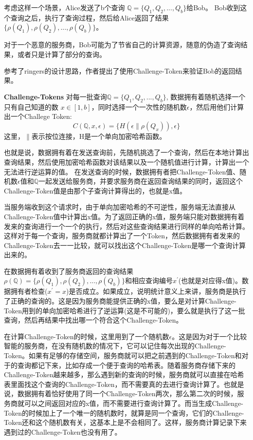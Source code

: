 考虑这样一个场景，Alice发送了b个查询 $\mathbb{Q} = \{Q_1, Q_2, ... ,Q_b\}$给Bob。
Bob收到这个查询之后，执行了查询过程，然后给Alice返回了结果$\{\rho(Q_1), \rho(Q_2), ..., \rho(Q_b)\}$。

对于一个恶意的服务商，Bob可能为了节省自己的计算资源，随意的伪造了查询结果，或者只是计算了部分的查询。

参考了ringers\cite{golle2001uncheatable}的设计思路，作者提出了使用Challenge-Token来验证Bob的返回结果。

\textbf{Challenge-Tokens} 对每一批查询$\mathbb{Q} = \{Q_1, Q_2, ... ,Q_b\}$, 数据拥有着随机选择一个只有自己知道的数 $x \in [1, b]$，同时选择一个一次性的随机数$\epsilon$，然后用他们计算出一个Challege Token:
\begin{equation} C(\mathbb{Q}, x, \epsilon) = \{H(\epsilon \parallel \rho(Q_x)), \epsilon\}\end{equation}
这里，$\parallel$表示按位连接，H是一个单向加密哈希函数。

也就是说，数据拥有着在发送查询前，先随机挑选了一个查询，然后在本地计算出查询结果，然后使用加密哈希函数对该结果以及一个随机值进行计算，计算出一个无法进行逆运算的值。
在发送查询的时候，数据拥有者把Challenge-Token值、随机数$\epsilon$值和$\mathbb{Q}$一起发送给服务商，并要求服务商在返回查询结果的同时，返回这个Challenge-Token值是由那个子查询计算得出的，也就是x值。

当服务端收到这个请求时，由于单向加密哈希的不可逆性，服务端无法直接从Challenge-Token值中计算出x值。为了返回正确的x值，服务端只能对数据拥有着发来的查询进行一个一个的执行，然后对这些查询结果进行同样的单向哈希计算。这样对于每一个查询，服务商就都计算出了一个Token，然后数据拥有者发来的Challenge-Token去一一比较，就可以找出这个Challenge-Token是哪一个查询计算出来的。

在数据拥有着收到了服务商返回的查询结果$\rho(\mathbb{Q}) = \{\rho(Q_1), \rho(Q_2), ..., \rho(Q_b)\}$和相应查询编号$x^\prime$(也就是对应得x值)。数据拥有者检查($x^\prime = x$)是否成立。如果成立，说明统计意义上来讲，服务商是执行了正确的查询的。这是因为服务商能提供正确的x值，要么是对计算Challenge-Token用到的单向加密哈希进行了逆运算(这是不可能的)，要么就是执行了这一批查询，然后再结果中找出哪一个符合这个Challenge-Token。

在计算Challenge-Token的时候，这里用到了一个随机数$\epsilon$。这是因为对于一个比较智能的服务商，在没有随机数的情况下，它可以记住每次出现的Challenge-Token。如果有足够的存储空间，服务商就可以把之前遇到的Challenge-Token和对于的查询都记下来，比如存成一个便于查询的哈希表。随着服务商存储下来的Challenge-Token越来越多，那么遇到新的查询的时候，服务商就可以直接在哈希表里面找这个查询的Challenge-Token，而不需要真的去进行查询计算了。也就是说，数据拥有着恰好使用了同一个Challenge-Token两次，那么第二次的时候，服务商就可以之间返回对应的x值，而不需要进行查询计算了。而当生成Challenge-Token的时候加上了一个唯一的随机数时，就算是同一个查询，它们的Challenge-Token还和这个随机数有关，这基本上是不会相同了。这样，服务商计算记录下来遇到过的Challenge-Token也没有用了。

